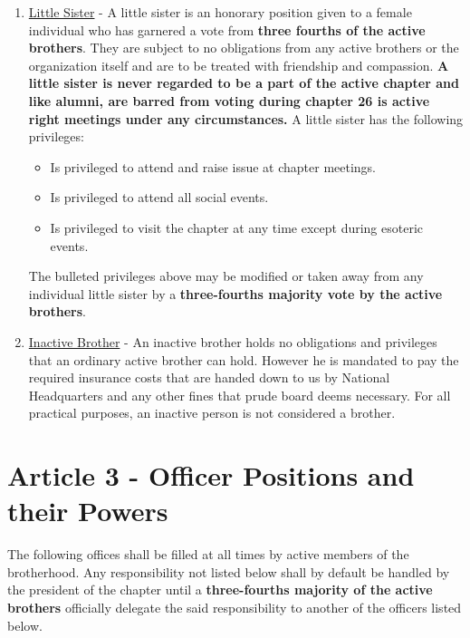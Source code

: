 \documentclass{article}
\begin{document}
\begin{enumerate}
    \begin{itemize}
        \item Must pay all debts owed to the chapter in that were accrued as an active member.
        \item Is privileged to attend and raise issue at chapter meetings.
        \item Is privileged to attend all ritualistic events.
        \item Is privileged to attend all social events.
        \item Is privileged to visit the chapter at any time.
    \end{itemize}
    The bulleted obligations and privileges above may be modified or taken away from any individual alumnus by a \textbf{three-fifths majority vote by the active brothers}.
    \item  \underline{Little Sister} - A little sister is an honorary position given to a female individual who has garnered a vote from \textbf{three fourths of the active brothers}. They are subject to no obligations from any active brothers or the organization itself and are to be treated with friendship and compassion. \textbf{A little sister is never regarded to be a part of the active chapter and like alumni, are barred from voting during chapter 26 is active right meetings under any circumstances.} A little sister has the following privileges:
    \begin{itemize}
        \item Is privileged to attend and raise issue at chapter meetings.
        \item Is privileged to attend all social events.
        \item Is privileged to visit the chapter at any time except during esoteric events.
    \end{itemize}
    The bulleted privileges above may be modified or taken away from any individual little sister by a \textbf{three-fourths majority vote by the active brothers}.
    \item \underline{Inactive Brother} - An inactive brother holds no obligations and privileges that an ordinary active brother can hold. However he is mandated to pay the required insurance costs that are handed down to us by National Headquarters and any other fines that prude board deems necessary. For all practical purposes, an inactive person is not considered a brother.
\end{enumerate}

\section*{Article 3 - Officer Positions and their Powers}
\hspace*{1cm}The following offices shall be filled at all times by active members of the brotherhood. Any responsibility not listed below shall by default be handled by the president of the chapter until a \textbf{three-fourths majority of the active brothers} officially delegate the said responsibility to another of the officers listed below.\\
\end{document}
